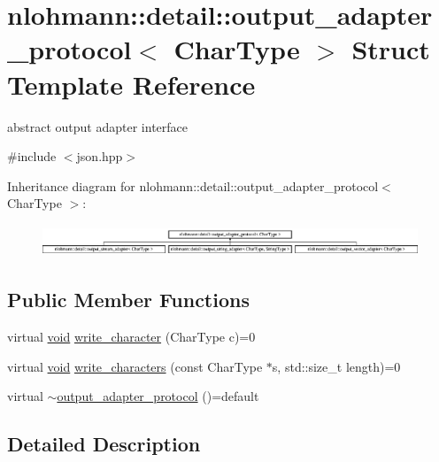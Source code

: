 \hypertarget{structnlohmann_1_1detail_1_1output__adapter__protocol}{}\section{nlohmann\+::detail\+::output\+\_\+adapter\+\_\+protocol$<$ Char\+Type $>$ Struct Template Reference}
\label{structnlohmann_1_1detail_1_1output__adapter__protocol}


abstract output adapter interface  




{\ttfamily \#include $<$json.\+hpp$>$}

Inheritance diagram for nlohmann\+::detail\+::output\+\_\+adapter\+\_\+protocol$<$ Char\+Type $>$\+:\begin{figure}[H]
\begin{center}
\leavevmode
\includegraphics[height=0.962199cm]{dc/d9b/structnlohmann_1_1detail_1_1output__adapter__protocol}
\end{center}
\end{figure}
\subsection*{Public Member Functions}
\begin{DoxyCompactItemize}
\item 
virtual \mbox{\hyperlink{namespacenlohmann_1_1detail_a59fca69799f6b9e366710cb9043aa77d}{void}} \mbox{\hyperlink{structnlohmann_1_1detail_1_1output__adapter__protocol_a3381896fe1be557f591de2e917cdc7d5}{write\+\_\+character}} (Char\+Type c)=0
\item 
virtual \mbox{\hyperlink{namespacenlohmann_1_1detail_a59fca69799f6b9e366710cb9043aa77d}{void}} \mbox{\hyperlink{structnlohmann_1_1detail_1_1output__adapter__protocol_a2f410a164e0eda17cf6561114b0eee4a}{write\+\_\+characters}} (const Char\+Type $\ast$s, std\+::size\+\_\+t length)=0
\item 
virtual \mbox{\hyperlink{structnlohmann_1_1detail_1_1output__adapter__protocol_ad71cdc057030f8a775a191face25061a}{$\sim$output\+\_\+adapter\+\_\+protocol}} ()=default
\end{DoxyCompactItemize}


\subsection{Detailed Description}
